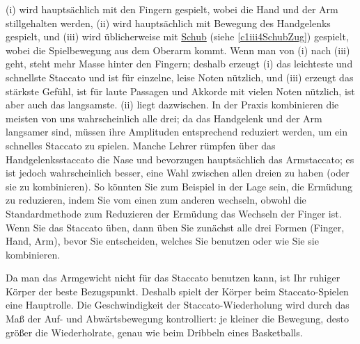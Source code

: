 (i) wird hauptsächlich mit den Fingern gespielt, wobei die Hand und der Arm stillgehalten werden, (ii) wird hauptsächlich mit Bewegung des Handgelenks gespielt, und (iii) wird üblicherweise mit \hyperref[c1iii4SchubZug]{Schub} (siehe \ref*{c1iii4SchubZug}) gespielt, wobei die Spielbewegung aus dem Oberarm kommt.
Wenn man von (i) nach (iii) geht, steht mehr Masse hinter den Fingern; deshalb erzeugt (i) das leichteste und schnellste Staccato und ist für einzelne, leise Noten nützlich, und (iii) erzeugt das stärkste Gefühl, ist für laute Passagen und Akkorde mit vielen Noten nützlich, ist aber auch das langsamste.
(ii) liegt dazwischen.
In der Praxis kombinieren die meisten von uns wahrscheinlich alle drei; da das Handgelenk und der Arm langsamer sind, müssen ihre Amplituden entsprechend reduziert werden, um ein schnelles Staccato zu spielen.
Manche Lehrer rümpfen über das Handgelenksstaccato die Nase und bevorzugen hauptsächlich das Armstaccato; es ist jedoch wahrscheinlich besser, eine Wahl zwischen allen dreien zu haben (oder sie zu kombinieren).
So könnten Sie zum Beispiel in der Lage sein, die Ermüdung zu reduzieren, indem Sie vom einen zum anderen wechseln, obwohl die Standardmethode zum Reduzieren der Ermüdung das Wechseln der Finger ist.
Wenn Sie das Staccato üben, dann üben Sie zunächst alle drei Formen (Finger, Hand, Arm), bevor Sie entscheiden, welches Sie benutzen oder wie Sie sie kombinieren.

Da man das Armgewicht nicht für das Staccato benutzen kann, ist Ihr ruhiger Körper der beste Bezugspunkt.
Deshalb spielt der Körper beim Staccato-Spielen eine Hauptrolle.
Die Geschwindigkeit der Staccato-Wiederholung wird durch das Maß der Auf- und Abwärtsbewegung kontrolliert: je kleiner die Bewegung, desto größer die Wiederholrate, genau wie beim Dribbeln eines Basketballs.
  


